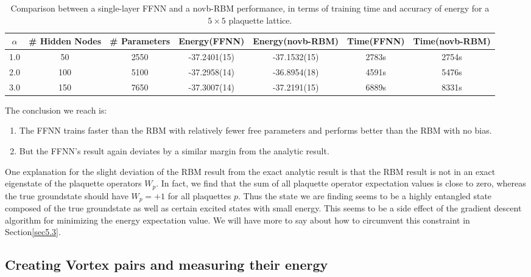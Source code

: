 \documentclass{article}
\begin{document}
\begin{table}[!htb]
	\centering
    {
    \begin{tabular}{|c|c|c|c|c|c|c|}
    \hline
    $\alpha$&\# Hidden Nodes&\# Parameters&Energy(FFNN)&Energy(novb-RBM)&Time(FFNN)&Time(novb-RBM)\\
    \hline \hline
    1.0& 50&2550&-37.2401(15)&-37.1532(15)&2783s&2754s\\
    \hline
    2.0&100&5100&-37.2958(14)&-36.8954(18)&4591s&5476s\\
    \hline
    3.0&150&7650&-37.3007(14)&-37.2191(15)&6889s&8331s\\
    \hline
    \end{tabular}}
    \vspace{2mm}
	\caption{\label{tab:ffnn} Comparison between a single-layer FFNN and a novb-RBM performance, in terms of training time and accuracy of energy for a $5 \times 5$ plaquette lattice.} 
\end{table}    

The conclusion we reach is:
\begin{enumerate}
	\item The FFNN trains faster than the RBM with relatively fewer free parameters and performs better than the RBM with no bias.
	\item But the FFNN's result again deviates by a similar margin from the analytic result.
\end{enumerate}

One explanation for the slight deviation of the RBM result from the exact analytic result is that the RBM result is not in an exact eigenstate of the plaquette operators $W_p$. In fact, we find that the sum of all plaquette operator expectation values is close to zero, whereas the true groundstate should have $W_p = + 1$ for all plaquettes $p$. Thus the state we are finding seems to be a highly entangled state composed of the true groundstate as well as certain excited states with small energy. This seems to be a side effect of the gradient descent algorithm for minimizing the energy expectation value. We will have more to say about how to circumvent this constraint in Section\hspace{0.2mm}\ref{sec5.3}.

\subsection{Creating Vortex pairs and measuring their energy}
\end{document}
